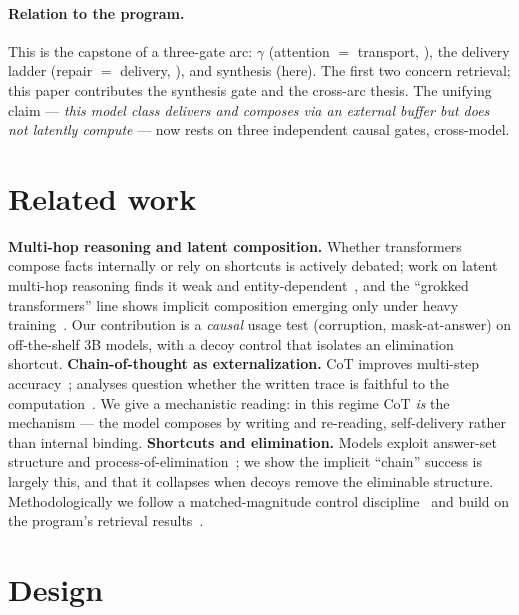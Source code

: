 \documentclass[11pt]{article}
\begin{document}
\paragraph{Relation to the program.}
This is the capstone of a three-gate arc: $\gamma$ (attention $=$ transport,
\cite{paper3retention}), the delivery ladder (repair $=$ delivery,
\cite{paper4arc}), and synthesis (here). The first two concern retrieval; this paper
contributes the synthesis gate and the cross-arc thesis. The unifying claim ---
\emph{this model class delivers and composes via an external buffer but does not
latently compute} --- now rests on three independent causal gates, cross-model.

\section{Related work}
\label{sec:related}

\textbf{Multi-hop reasoning and latent composition.} Whether transformers compose
facts internally or rely on shortcuts is actively debated; work on latent multi-hop
reasoning finds it weak and entity-dependent~\cite{yang2024latent}, and the ``grokked
transformers'' line shows implicit composition emerging only under heavy
training~\cite{wang2024grokking}. Our contribution is a \emph{causal} usage test
(corruption, mask-at-answer) on off-the-shelf 3B models, with a decoy control that
isolates an elimination shortcut. \textbf{Chain-of-thought as externalization.} CoT
improves multi-step accuracy~\cite{wei2022cot}; analyses question whether the written
trace is faithful to the computation~\cite{lanham2023faithfulness}. We give a
mechanistic reading: in this regime CoT \emph{is} the mechanism --- the model composes
by writing and re-reading, self-delivery rather than internal binding.
\textbf{Shortcuts and elimination.} Models exploit answer-set structure and
process-of-elimination~\cite{balepur2024elimination}; we show the implicit ``chain''
success is largely this, and that it collapses when decoys remove the eliminable
structure. Methodologically we follow a matched-magnitude control
discipline~\cite{matchedcontrols2026} and build on the program's retrieval
results~\cite{paper3retention,paper4arc}.

\section{Design}
\label{sec:design}
\end{document}
